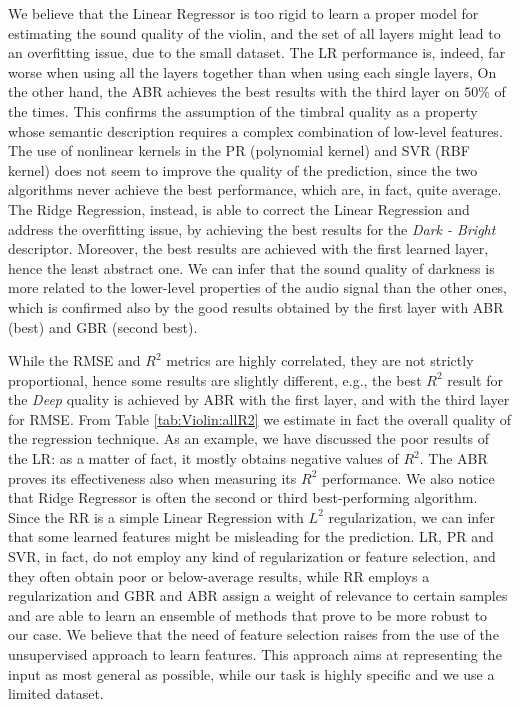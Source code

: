 We believe that the Linear Regressor is too rigid to learn a proper model for estimating the sound quality of the violin, and the set of all layers might lead to an overfitting issue, due to the small dataset. The LR performance is, indeed, far worse when using all the layers together than when using each single layers,
On the other hand, the ABR achieves the best results with the third layer on $50 \%$ of the times. This confirms the assumption of the timbral quality as a property whose semantic description requires a complex combination of low-level features.
The use of nonlinear kernels in the PR (polynomial kernel) and SVR (RBF kernel) does not seem to improve the quality of the prediction, since the two algorithms never achieve the best performance, which are, in fact, quite average. The Ridge Regression, instead, is able to correct the Linear Regression and address the overfitting issue, by achieving the best results for the \textit{Dark - Bright} descriptor. Moreover, the best results are achieved with the first learned layer, hence the least abstract one. We can infer that the sound quality of darkness is more related to the lower-level properties of the audio signal than the other ones, which is confirmed also by the good results obtained by the first layer with ABR (best) and GBR (second best). 

While the RMSE and $R^2$ metrics are highly correlated, they are not strictly proportional, hence some results are slightly different, e.g., the best $R^2$  result for the \textit{Deep} quality is achieved by ABR with the first layer, and with the third layer for RMSE. From Table \ref{tab:Violin:allR2} we estimate in fact  the overall quality of the regression technique. As an example, we have discussed the poor results of the LR: as a matter of fact, it mostly obtains negative values of $R^2$. The ABR proves its effectiveness also when measuring its $R^2$ performance. We also notice that Ridge Regressor is often the second or third best-performing algorithm. Since the RR is a simple Linear Regression with $L^2$ regularization, we can infer that some learned features might be misleading for the prediction. LR, PR and SVR, in fact, do not employ any kind of regularization or feature selection, and they often obtain poor or below-average results, while RR employs a regularization and GBR and ABR assign a weight of relevance to certain samples and are able to learn an ensemble of methods that prove to be more robust to our case. We believe that the need of feature selection raises from the use of the unsupervised approach to learn features. This approach aims at representing the input as most general as possible, while our task is highly specific and we use a limited dataset.

